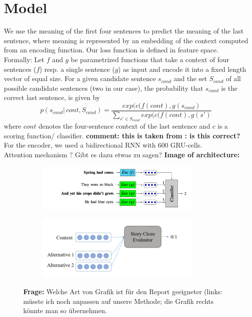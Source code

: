 \documentclass{article}
\begin{document}
\section{Model}
We use the meaning of the first four sentences to predict the meaning of the last sentence, where meaning is represented by an embedding of the context computed from an encoding function. Our loss function is defined in feature space. \\[.1cm]
Formally: Let $f$ and $g$ be parametrized functions that take a context of four sentences ($f$) resp. a single sentence ($g$) as input and encode it into a fixed length vector of equal size. For a given candidate sentence $s_{cand}$ and the set $S_{cand}$ of all possible candidate sentences (two in our case), the probability that $s_{cand}$ is the correct last sentence, is given by 
$$
p(s_{cand} | \, cont, S_{cand}) = \frac{exp(c(f(cont), g(s_{cand})}{\sum_{s' \in S_{cand}}exp(c(f(cont), g(s')}
$$
where $cont$ denotes the four-sentence context of the last sentence and $c$ is a scoring function/ classifier. {\bf comment: this is taken from \cite{eff_framework}: is this correct?}
\\[.1cm]
For the encoder, we used a bidirectional RNN with 600 GRU-cells. \\[.1cm]
Attention mechanism ? Gibt es dazu etwas zu sagen?
{\bf Image of architecture:}
\begin{figure}[h]
\begin{subfigure}[c]{0.5\textwidth}

\includegraphics[width=0.9\textwidth]{fig1_architecture}

\end{subfigure}
\begin{subfigure}[c]{0.4\textwidth}

\includegraphics[width=0.9\textwidth]{fig2_architecture}

\end{subfigure}
\caption{{\bf Frage: }Welche Art von Grafik ist für den Report geeigneter (links: m\"usste ich noch anpassen auf unsere Methode; die Grafik rechts k\"onnte man so \"ubernehmen.}
\end{figure}
\end{document}
